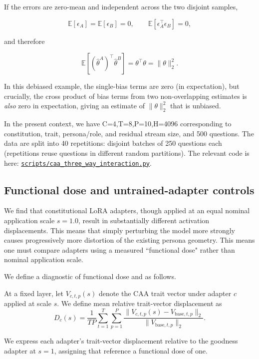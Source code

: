 \documentclass[11pt]{article}
\newcommand{\provbase}{https://anonymous.4open.science/r/steering_across_personas-8046/}
\DeclareRobustCommand{\provlink}[1]{\href{\provbase/#1}{\nolinkurl{#1}}}
\begin{document}
If the errors are zero-mean and independent across the two disjoint
samples,

\[
\mathbb{E}[\epsilon_A]
=
\mathbb{E}[\epsilon_B]
=
0,
\qquad
\mathbb{E}\left[\epsilon_A^\top\epsilon_B\right]
=
0,
\]

and therefore

\[
\mathbb{E}\left[
\left(\hat{\theta}^{A}\right)^\top
\hat{\theta}^{B}
\right]
=
\theta^\top\theta
=
\|\theta\|_2^2.
\]

In this debiased example, the single-bias terms are zero (in expectation), but crucially, the cross product of bias terms from two non-overlapping estimates is \textit{also} zero in expectation, giving an estimate of $\|\theta\|_2^2$ that is unbiased.

In the present context, we have C=4,T=8,P=10,H=4096 corresponding to constitution, trait, persona/role, and residual stream size, and 500 questions. The data are split into 40 repetitions: disjoint batches of 250 questions each (repetitions reuse questions in different random partitions). The relevant code is here: \provlink{scripts/caa_three_way_interaction.py}.


\subsection{Functional dose and untrained-adapter controls}
\label{app:f-dose}
We find that constitutional LoRA adapters, though applied at an equal nominal application scale $s=1.0$, result in substantially different activation displacements. This means that simply perturbing the model more strongly causes progressively more distortion of the existing persona geometry. This means one must compare adapters using a measured ``functional dose" rather than nominal application scale.

We define a diagnostic of functional dose and as follows. 

At a fixed layer, let $V_{c,t,p}(s)$ denote the CAA trait vector
under adapter $c$ applied at scale $s$. We define mean relative
trait-vector displacement as
\begin{equation}
D_c(s)
=
\frac{1}{TP}
\sum_{t=1}^{T}\sum_{p=1}^{P}
\frac{
    \|V_{c,t,p}(s)-V_{\mathrm{base},t,p}\|_2
}{
    \|V_{\mathrm{base},t,p}\|_2
}.
\end{equation}

We express each adapter’s trait-vector displacement relative to the goodness adapter at \(s=1\), assigning that reference a functional dose of one.
\end{document}
